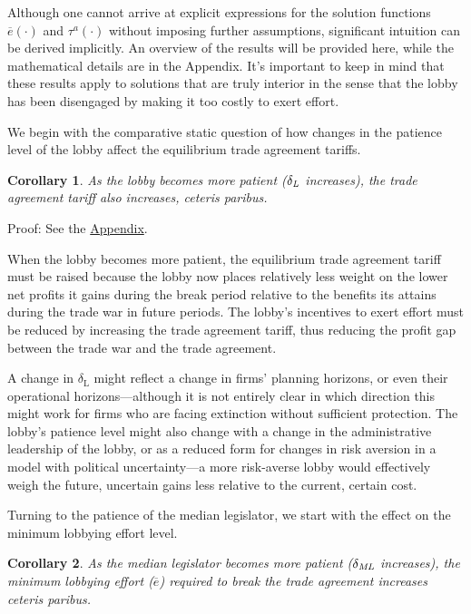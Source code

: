 \documentclass[authoryear, review]{elsarticle}
\newtheorem{corollary}{Corollary}
\newcommand{\ov}{\overline}
\newcommand{\de}{\delta}
\begin{document}
Although one cannot arrive at explicit expressions for the solution functions $\ov{e}(\cdot)$ and $\tau^a(\cdot)$ without imposing further assumptions, significant intuition can be derived implicitly. An overview of the results will be provided here, while the mathematical details are in the Appendix. It's important to keep in mind that these results apply to solutions that are truly interior in the sense that the lobby has been disengaged by making it too costly to exert effort.

We begin with the comparative static question of how changes in the patience level of the lobby affect the equilibrium trade agreement tariffs.

\begin{corollary}
  As the lobby becomes more patient ($\de_\emph{L}$ increases), the trade agreement tariff also increases, \emph{ceteris paribus}.
  \label{cor:tdl}
\end{corollary}

Proof: See the \hyperlink{Cor_tdl}{Appendix}.

\noindent When the lobby becomes more patient, the equilibrium trade agreement tariff must be raised because the lobby now places relatively less weight on the lower net profits it gains during the break period relative to the benefits its attains during the trade war in future periods. The lobby's incentives to exert effort must be reduced by increasing the trade agreement tariff, thus reducing the profit gap between the trade war and the trade agreement.

A change in $\de_\text{L}$ might reflect a change in firms' planning horizons, or even their operational horizons---although it is not entirely clear in which direction this might work for firms who are facing extinction without sufficient protection. The lobby's patience level might also change with a change in the administrative leadership of the lobby, or as a reduced form for changes in risk aversion in a model with political uncertainty---a more risk-averse lobby would effectively weigh the future, uncertain gains less relative to the current, certain cost.

Turning to the patience of the median legislator, we start with the effect on the minimum lobbying effort level.

\begin{corollary}
  As the median legislator becomes more patient ($\de_\emph{ML}$ increases), the minimum lobbying effort ($\ov{e}$) required to break the trade agreement increases \emph{ceteris paribus}.
  \label{cor:edm}
\end{corollary}
\end{document}
